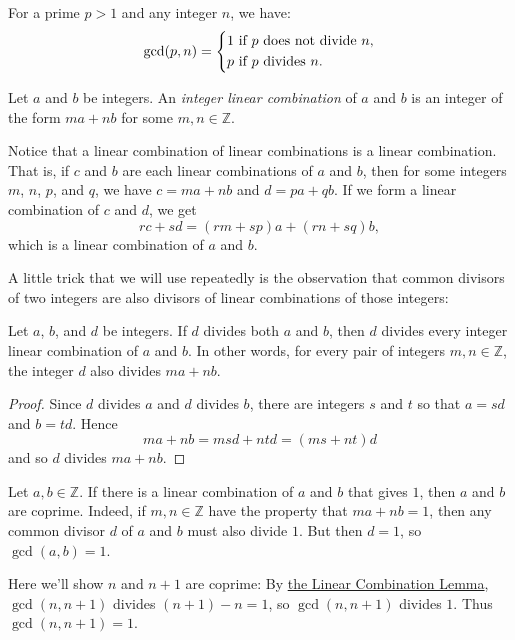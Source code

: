 \documentclass[11pt,dvipsnames]{book}
\def\Z{\mathbb{Z}}
\numberwithin{figure}{section} %
\numberwithin{table}{section} %
\begin{document}
For a prime $p>1$ and any integer $n$, we have:
$$
\gcd(p,n) = \left\{\aligned%
&1\ \text{if $p$ does not divide $n$},\\
&p\ \text{if $p$  divides $n$}.\\
\endaligned
\right.
$$

\begin{definition}
Let $a$ and $b$ be integers.
An \emph{integer linear combination} of $a$ and $b$ is an integer of the form $ma + nb$ for some $m,n \in \Z$.
\end{definition}

Notice that a linear combination of linear combinations is a linear combination.
That is, if $c$ and $b$ are each linear combinations of $a$ and $b$, then for some integers $m$, $n$, $p$, and $q$, we have $c = m a + n b$ and $d = p a + q b$.
If we form a linear combination of $c$ and $d$, we get
\[
r c + s d = (rm+sp)a + (rn+sq)b,
\]
which is a linear combination of $a$ and $b$.

A little trick that we will use repeatedly is the observation that common divisors of two integers are also divisors of linear combinations of those integers:

\begin{lemma}
\label{l:easy-lemma}
Let $a$, $b$, and $d$ be integers. If $d$ divides both $a$ and $b$, then $d$ divides every integer linear combination of $a$ and $b$.
In other words, for every pair of integers $m,n\in\mathbb{Z}$, the integer $d$ also divides $ma + nb$.
\end{lemma}

\begin{proof}
Since $d$ divides $a$ and $d$ divides $b$, there are integers $s$ and $t$ so that $a=sd$ and $b=td$.
Hence
\[
ma+nb=msd+ntd=(ms+nt)d\]
and so $d$ divides $ma+nb$.
\end{proof}

\def\easylemma{\hyperref[l:easy-lemma]{the Linear Combination Lemma}}

\begin{example}
Let $a, b \in \Z$.
If there is a linear combination of $a$ and $b$ that gives $1$, then $a$ and $b$ are coprime.
Indeed, if $m,n \in \Z$ have the property that $ma+nb = 1$, then any common divisor $d$ of $a$ and $b$ must also divide $1$. But then $d=1$, so $\gcd(a,b)=1$.

Here we'll show $n$ and $n+1$ are coprime: By \easylemma, $\gcd(n,n+1)$ divides $(n+1)-n=1$, so $\gcd(n,n+1)$ divides $1$. Thus $\gcd(n,n+1)=1$.
\end{example}
\end{document}
